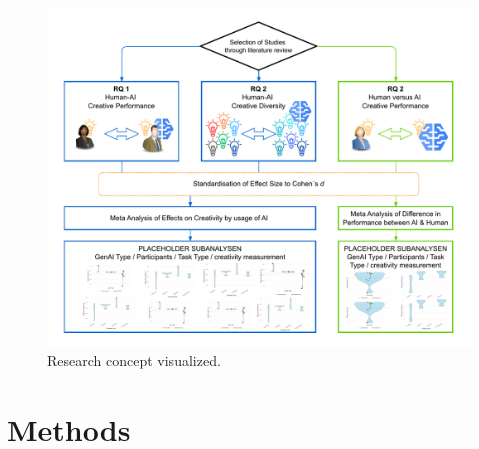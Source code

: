 \documentclass[acmsmall,authorversion]{acmart}
\begin{document}
\begin{figure}[H]
  \centering
  \includegraphics[width=\linewidth]{MetaAnalysis_LLM_Creativity_Research_Concept}
  \caption{Research concept visualized.}
\end{figure}
\newpage
\section{Methods}
\label{sec:Methods}
\end{document}
